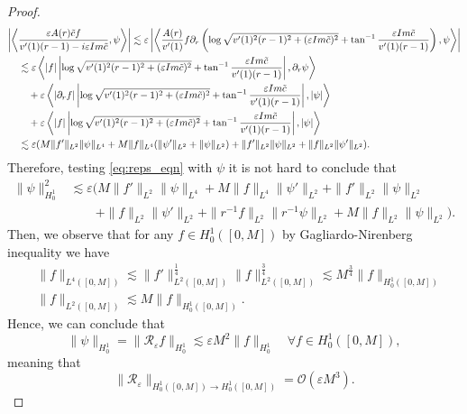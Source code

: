 \documentclass[10pt,a4paper]{amsart}
\def\Im{{\rm Im}}
\def\de{{\partial}}
\def\eps{\varepsilon}
\newcommand{\taninv}{\tan^{-1}}
\begin{document}
\begin{proof}
\begin{align}
    \bigg|\bigg\langle &\frac{\varepsilon A(r) \tilde c f}{v'(1)(r-1) - i \varepsilon \Im \tilde c}, \psi \bigg\rangle\bigg| \lesssim \varepsilon\left|\left\langle \frac{A(r)}{v'(1)}  f  \de_r \left(\log\sqrt{v'(1)^2(r-1)^2 + (\varepsilon \Im\tilde{c})^2} + \taninv\frac{\varepsilon \Im \tilde{c}}{v'(1)(r-1)}\right), \psi \right\rangle\right| \\
    & \lesssim \varepsilon \left\langle |f| \left|\log\sqrt{v'(1)^2(r-1)^2 + (\varepsilon \Im\tilde{c})^2} + \taninv\frac{\varepsilon \Im \tilde{c}}{v'(1)(r-1)}\right|, \de_r \psi \right\rangle \\ 
    & \quad + \varepsilon\left\langle |\de_r f| \left|\log\sqrt{v'(1)^2(r-1)^2 + (\varepsilon \Im\tilde{c})^2} + \taninv\frac{\varepsilon \Im \tilde{c}}{v'(1)(r-1)}\right|, |\psi| \right\rangle\\
    &\quad +\varepsilon\left\langle |f| \left|\log\sqrt{v'(1)^2(r-1)^2 + (\varepsilon \Im\tilde{c})^2} + \taninv\frac{\varepsilon \Im \tilde{c}}{v'(1)(r-1)}\right|, |\psi| \right\rangle\\
    & \lesssim \varepsilon (M\|f'\|_{L^2}\|\psi\|_{L^4} + M\|f\|_{L^4}(\|\psi'\|_{L^2}+\|\psi\|_{L^2}) + \|f'\|_{L^2}\|\psi\|_{L^2} + \|f\|_{L^2}\|\psi'\|_{L^2}).
\end{align}
Therefore, testing \cref{eq:reps_eqn} with $\psi$  it is not hard to conclude that 
\begin{align}
    \| \psi\|^2_{H^1_0} 
     & \lesssim \varepsilon (M\|f'\|_{L^2}\|\psi\|_{L^4} + M\|f\|_{L^4}\|\psi'\|_{L^2} + \|f'\|_{L^2}\|\psi\|_{L^2}  \\ & \qquad +\|f\|_{L^2}\|\psi'\|_{L^2}+ \| r^{-1} f\|_{L^2} \| r^{-1} \psi\|_{L^2} +  M \|f\|_{L^2}\|\psi\|_{L^2}) .
\end{align}
Then, we observe that for any $f\in H^1_0([0,M])$ by Gagliardo-Nirenberg inequality we have
\begin{align}
    &\| f\|_{L^4([0,M])}\lesssim  \|f'\|_{L^2([0,M])}^\frac14\|f\|_{L^2([0,M])}^\frac34\lesssim M^\frac34 \|f\|_{H^1_0([0,M])} \label{eq:L4M}\\
    &\| f\|_{L^2([0,M])} \lesssim M\|f\|_{H^1_0([0,M])}\label{eq:L2M}.
\end{align}
Hence, we can conclude that
\begin{equation}
\|\psi\|_{H^1_0} = \| \mathcal R_{\varepsilon} f \|_{H^1_0} \lesssim \eps M^2 \|f\|_{H^1_0}\quad \forall f \in H^1_0([0,M]), 
\end{equation}
meaning that 
\begin{equation}
\label{eq:Reps_est}
\| \mathcal R_{\varepsilon} \|_{H^1_0([0,M]) \rightarrow H^1_0([0,M])} = \mathcal{O}(\varepsilon M^3). 
\end{equation}


\end{proof}
\end{document}
